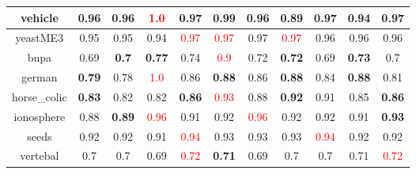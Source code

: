 \documentclass{article}%
\begin{document}
\begin{tabular}{c|cccccccccc}
\hline%
vehicle&0.96&0.96&\textcolor{red}{ 
1.0
}&0.97&\textbf{0.99}&0.96&0.89&\textbf{0.97}&0.94&\textbf{0.97}\\%
\hline%
yeastME3&0.95&0.95&0.94&\textcolor{red}{ 
0.97
}&\textcolor{red}{ 
0.97
}&0.97&\textcolor{red}{ 
0.97
}&0.96&0.96&0.96\\%
\hline%
bupa&0.69&\textbf{0.7}&\textbf{0.77}&0.74&\textcolor{red}{ 
0.9
}&0.72&\textbf{0.72}&0.69&\textbf{0.73}&0.7\\%
\hline%
german&\textbf{0.79}&0.78&\textcolor{red}{ 
1.0
}&0.86&\textbf{0.88}&0.86&\textbf{0.88}&0.84&\textbf{0.88}&0.81\\%
\hline%
horse\_colic&\textbf{0.83}&0.82&0.82&\textbf{0.86}&\textcolor{red}{ 
0.93
}&0.88&\textbf{0.92}&0.91&0.85&\textbf{0.86}\\%
\hline%
ionosphere&0.88&\textbf{0.89}&\textcolor{red}{ 
0.96
}&0.91&0.92&\textcolor{red}{ 
0.96
}&0.92&0.92&0.91&\textbf{0.93}\\%
\hline%
seeds&0.92&0.92&0.91&\textcolor{red}{ 
0.94
}&0.93&0.93&0.93&\textcolor{red}{ 
0.94
}&0.92&0.92\\%
\hline%
vertebal&0.7&0.7&0.69&\textcolor{red}{ 
0.72
}&\textbf{0.71}&0.69&0.7&0.7&0.71&\textcolor{red}{ 
0.72
}\\%
\hline%
\end{tabular}

%
\end{document}
